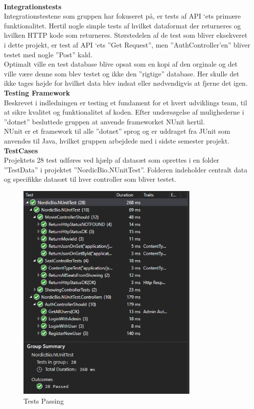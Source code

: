 \\
\textbf{Integrationstests}\\
Integrationstestene som gruppen har fokuseret på, er tests af API ‘ets primære funktionalitet. 
Hertil nogle simple tests af hvilket dataformat der returneres og hvilken HTTP kode som returneres. 
Størstedelen af de test som bliver eksekveret i dette projekt, er test af API ‘ets ”Get Request”, men 
”AuthController’en” bliver testet med nogle ”Post” kald. \\

Optimalt ville en test database blive opsat som en kopi af den orginale og det ville være denne som 
blev testet og ikke den ”rigtige” database. Her skulle det ikke tages højde for hvilket data blev indsat 
eller nødvendigvis at fjerne det igen.\\ 

\textbf{Testing Framework}\\
Beskrevet i indledningen er testing et fundament for et hvert udviklings team, til at sikre 
kvalitet og funktionalitet af koden. Efter undersøgelse af mulighederne i ”dotnet” besluttede 
gruppen at anvende frameworket NUnit hertil. \\

NUnit er et framework til alle ”dotnet” sprog og er uddraget fra JUnit som anvendes til Java, 
hvilket gruppen arbejdede med i sidste semester projekt.\\

\textbf{TestCases}\\
Projektets 28 test udføres ved hjælp af datasæt som oprettes i en folder ”TestData” i projektet 
”NordicBio.NUnitTest”. Folderen indeholder centralt data og specifikke datasæt til hver controller 
som bliver testet. \\

\begin{figure}[!h]
    \centering
    \includegraphics[width=0.8\textwidth]{figures/testpassing.PNG}
    \caption{Tests Passing}
    \label{fig:testpassing}
\end{figure}

